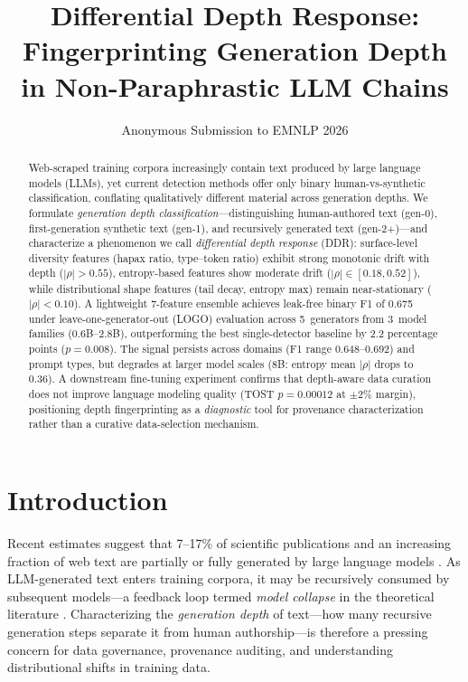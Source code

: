 \documentclass[11pt,a4paper]{article}
\title{Differential Depth Response: Fingerprinting Generation Depth\\in Non-Paraphrastic LLM Chains}
\author{
  Anonymous Submission to EMNLP 2026
}
\date{}
\begin{document}
\maketitle

\begin{abstract}
Web-scraped training corpora increasingly contain text produced by large language models (LLMs), yet current detection methods offer only binary human-vs-synthetic classification, conflating qualitatively different material across generation depths.
We formulate \emph{generation depth classification}---distinguishing human-authored text (gen-0), first-generation synthetic text (gen-1), and recursively generated text (gen-2+)---and characterize a phenomenon we call \emph{differential depth response} (DDR): surface-level diversity features (hapax ratio, type--token ratio) exhibit strong monotonic drift with depth ($|\rho| > 0.55$), entropy-based features show moderate drift ($|\rho| \in [0.18, 0.52]$), while distributional shape features (tail decay, entropy max) remain near-stationary ($|\rho| < 0.10$).
A lightweight 7-feature ensemble achieves leak-free binary F1 of 0.675 under leave-one-generator-out (LOGO) evaluation across 5~generators from 3~model families (0.6B--2.8B), outperforming the best single-detector baseline by 2.2 percentage points ($p = 0.008$).
The signal persists across domains (F1 range 0.648--0.692) and prompt types, but degrades at larger model scales (8B: entropy mean $|\rho|$ drops to 0.36).
A downstream fine-tuning experiment confirms that depth-aware data curation does not improve language modeling quality (TOST $p = 0.00012$ at $\pm 2\%$ margin), positioning depth fingerprinting as a \emph{diagnostic} tool for provenance characterization rather than a curative data-selection mechanism.
\end{abstract}

\section{Introduction}

Recent estimates suggest that 7--17\% of scientific publications and an increasing fraction of web text are partially or fully generated by large language models \cite{liang2024mapping}.
As LLM-generated text enters training corpora, it may be recursively consumed by subsequent models---a feedback loop termed \emph{model collapse} in the theoretical literature \cite{shumailov2024model}.
Characterizing the \emph{generation depth} of text---how many recursive generation steps separate it from human authorship---is therefore a pressing concern for data governance, provenance auditing, and understanding distributional shifts in training data.
\end{document}
